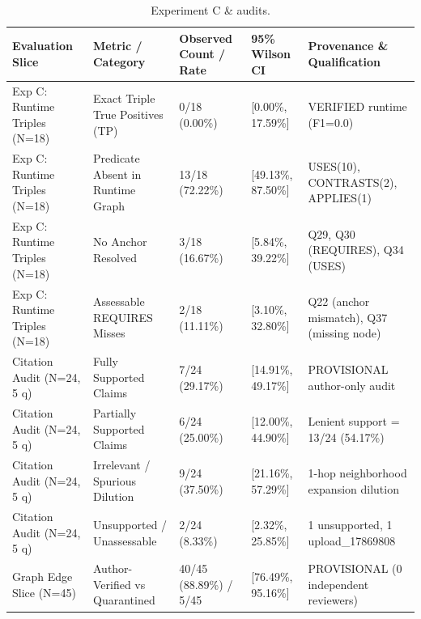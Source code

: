 \begin{table}[t]
\centering
\caption{Experiment C & audits.}
\label{tab:t4_grounding}
\small
\begin{tabular}{@{}lllll@{}}
\toprule
\textbf{Evaluation Slice} & \textbf{Metric / Category} & \textbf{Observed Count / Rate} & \textbf{95\% Wilson CI} & \textbf{Provenance \& Qualification} \\
\midrule
Exp C: Runtime Triples (N=18) & Exact Triple True Positives (TP) & 0/18 (0.00\%) & [0.00\%, 17.59\%] & VERIFIED runtime (F1=0.0) \\
Exp C: Runtime Triples (N=18) & Predicate Absent in Runtime Graph & 13/18 (72.22\%) & [49.13\%, 87.50\%] & USES(10), CONTRASTS(2), APPLIES(1) \\
Exp C: Runtime Triples (N=18) & No Anchor Resolved & 3/18 (16.67\%) & [5.84\%, 39.22\%] & Q29, Q30 (REQUIRES), Q34 (USES) \\
Exp C: Runtime Triples (N=18) & Assessable REQUIRES Misses & 2/18 (11.11\%) & [3.10\%, 32.80\%] & Q22 (anchor mismatch), Q37 (missing node) \\
Citation Audit (N=24, 5 q) & Fully Supported Claims & 7/24 (29.17\%) & [14.91\%, 49.17\%] & PROVISIONAL author-only audit \\
Citation Audit (N=24, 5 q) & Partially Supported Claims & 6/24 (25.00\%) & [12.00\%, 44.90\%] & Lenient support = 13/24 (54.17\%) \\
Citation Audit (N=24, 5 q) & Irrelevant / Spurious Dilution & 9/24 (37.50\%) & [21.16\%, 57.29\%] & 1-hop neighborhood expansion dilution \\
Citation Audit (N=24, 5 q) & Unsupported / Unassessable & 2/24 (8.33\%) & [2.32\%, 25.85\%] & 1 unsupported, 1 upload\_17869808 \\
Graph Edge Slice (N=45) & Author-Verified vs Quarantined & 40/45 (88.89\%) / 5/45 & [76.49\%, 95.16\%] & PROVISIONAL (0 independent reviewers) \\
\bottomrule
\end{tabular}
\end{table}
